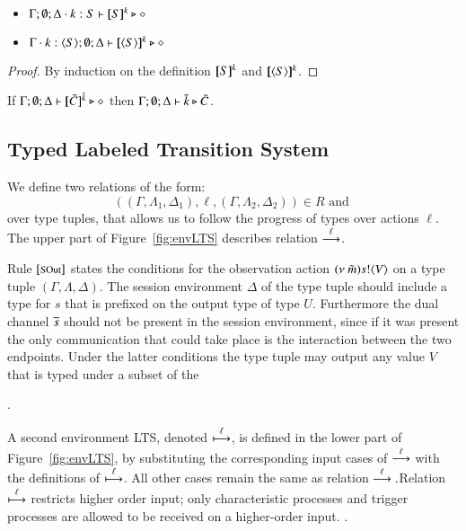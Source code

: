 \begin{proposition}\rm
$ $
	\begin{itemize}
		\item	$\Gamma; \emptyset; \Delta \cdot k:S \vdash [\!\![S]\!\!]^k \triangleright \diamond$
		\item	$\Gamma \cdot k:\langle S \rangle; \emptyset; \Delta \vdash [\!\![\langle S \rangle]\!\!]^k \triangleright \diamond$
	\end{itemize}
\end{proposition}

\begin{proof}
	By induction on the definition $[\!\![S]\!\!]^k$ and $[\!\![\langle S \rangle]\!\!]^k$.
\end{proof}

\begin{corollary}\rm
	If $\Gamma; \emptyset; \Delta \vdash [\!\![\tilde{C}]\!\!]^{\tilde{k}} \triangleright \diamond$
	then
	$\Gamma; \emptyset; \Delta \vdash \tilde{k} \triangleright \tilde{C}$.
\end{corollary}


\subsection{Typed Labeled Transition System}



We define two relations of the form:
%
\[
	((\Gamma, \Lambda_1, \Delta_1), \ell, (\Gamma, \Lambda_2, \Delta_2)) \in R \textrm{ and }
\]
%
\noi over type tuples, that allows us to follow the progress of types over actions $\ell$.
The upper part of Figure~\ref{fig:envLTS} describes relation $\stackrel{\ell}{\longrightarrow}$.

Rule ${\footnotesize [\textrm{SOut}]}$ states the conditions for the observation action
$(\nu\ \tilde{m}) s ! \langle V \rangle$ on a type tuple $(\Gamma, \Lambda, \Delta)$. 
The session environment $\Delta$ of the type tuple should include
a type for $s$ that is prefixed on the output type of type $U$.
Furthermore the dual channel $\overline{s}$ should not be
present in the session environment, since if it was present
the only communication that could take place is the interaction
between the two endpoints.
Under the latter conditions the type tuple may output any
value $V$ that is typed under a subset of the 


.

A second environment LTS, denoted $\stackrel{\ell}{\longmapsto}$, is defined in the lower part of
Figure~\ref{fig:envLTS}, by substituting the corresponding input cases
of $\stackrel{\ell}{\longrightarrow}$ with the definitions of $\stackrel{\ell}{\longmapsto}$. All other 
cases remain the same as relation $\stackrel{\ell}{\longrightarrow}. $Relation $\stackrel{\ell}{\longmapsto}$ 
restricts higher order input; only characteristic processes and trigger processes
are allowed to be received on a higher-order input.
. 

